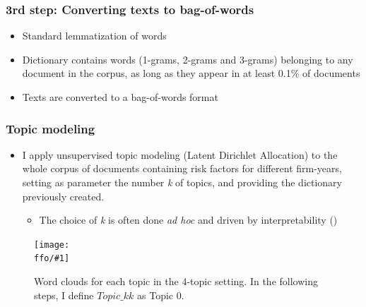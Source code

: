 \documentclass{beamer}
\newcommand{\ffo}{dicfullmc10thr10defnob40noa1_4t}
\newcommand{\insertfigure}[2]{
\begin{figure}[h!]
  \centering
  \texttt{[image: \\ffo/\#1]}
  \centering
  \captionsetup{font=scriptsize}
  \caption{#2}
  \label{fig:#1}
\end{figure}
}
\begin{document}
\begin{frame}
\frametitle{3rd step: Converting texts to bag-of-words}
\begin{itemize}
	\item Standard lemmatization of words
	\item Dictionary contains words (1-grams, 2-grams and 3-grams) belonging to any document in the corpus, as long as they appear in at least 0.1\% of documents \hyperlink{slide:ngram_details}{}

	\item Texts are converted to a bag-of-words format
\end{itemize}
\end{frame}



\begin{frame}
\frametitle{Topic modeling}
\begin{itemize}
\item I apply unsupervised topic modeling (Latent Dirichlet Allocation) to the whole corpus of documents containing risk factors for different firm-years, setting as parameter the number \textit{k} of topics, and providing the dictionary previously created.
\begin{itemize}
  \item The choice of \textit{k} is often done \textit{ad hoc} and driven by interpretability (\cite{Gentzkow2019-va})
\end{itemize}
\end{itemize}
\end{frame}

\begin{frame}
	\insertfigure{wordclouds}{Word clouds for each topic in the 4-topic setting. In the following steps, I define $Topic\_kk$ as Topic 0.}
\end{frame}
\end{document}
